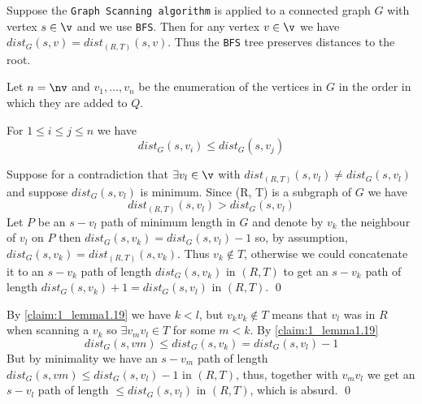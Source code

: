 \begin{lemma}
    Suppose the \texttt{Graph Scanning algorithm} is applied to a connected graph $G$ with vertex $s \in \v$ and we use \texttt{BFS}. Then for any vertex $v \in \v$ we have $dist_G(s, v) = dist_{(R, T)}(s, v)$. Thus the \texttt{BFS} tree preserves distances to the root.
\end{lemma}
\begin{prf}
    Let $n = \nv$ and $v_1, \dots, v_n$ be the enumeration of the vertices in $G$ in the order in which they are added to $Q$.
    \begin{claim}
        \label{claim:1_lemma1.19}
        For $1 \leq i \leq j \leq n$ we have
        \begin{equation*}
            dist_G(s, v_i) \leq dist_G(s, v_j)
        \end{equation*}
    \end{claim}
    \begin{prf}
        Suppose for a contradiction that $\exists v_l \in \v$ with $dist_{(R, T)}(s, v_l) \neq dist_G(s, v_l)$ and suppose $dist_G(s, v_l)$ is minimum. Since (R, T) is a subgraph of $G$ we have
        \begin{equation*}
            dist_{(R, T)}(s, v_l) > dist_G(s, v_l)
        \end{equation*}
        Let $P$ be an $s - v_l$ path of minimum length in $G$ and denote by $v_k$ the neighbour of $v_l$ on $P$ then $dist_G(s, v_k) = dist_G(s, v_l) - 1$ so, by assumption, $dist_G(s, v_k) = dist_{(R, T)}(s, v_k)$.
        Thus $v_k \notin T$, otherwise we could concatenate it to an $s - v_k$ path of length $dist_G(s, v_k)$ in $(R, T)$ to get an $s - v_k$ path of length $dist_G(s, v_k) + 1 = dist_G(s, v_l)$ in $(R, T)$. \qed
    \end{prf}
    By \ref{claim:1_lemma1.19} we have $k < l$, but $v_kv_k \notin T$ means that $v_l$ was in $R$ when scanning a $v_k$ so $\exists v_mv_l \in T$ for some $m < k$. By \ref{claim:1_lemma1.19}
    \begin{equation*}
        dist_G(s, vm) \leq dist_G(s, v_k) = dist_G(s, v_l) - 1
    \end{equation*}
    But by minimality we have an $s - v_m$ path of length $dist_G(s, vm) \leq dist_G(s, v_l) - 1$ in $(R, T)$, thus, together with $v_mv_l$ we get an $s - v_l$ path of length $\leq dist_G(s, v_l)$ in $(R, T)$, which is absurd. \qed
\end{prf}